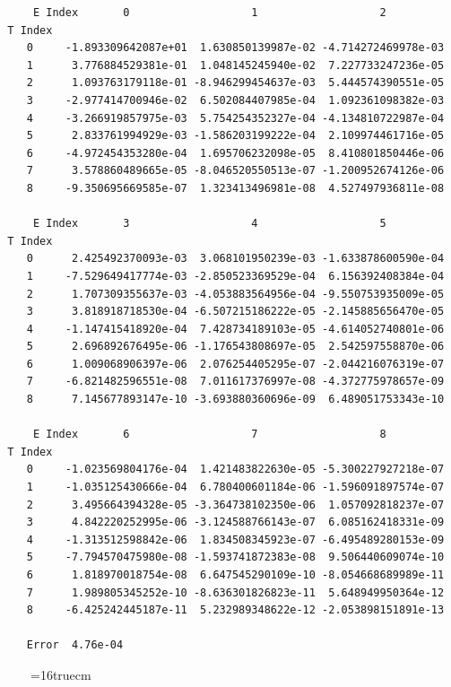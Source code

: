 \documentclass[12pt,dvipdfmx]{article}
\begin{document}
\begin{small}\begin{verbatim}
      E Index       0                   1                   2
  T Index
     0     -1.893309642087e+01  1.630850139987e-02 -4.714272469978e-03
     1      3.776884529381e-01  1.048145245940e-02  7.227733247236e-05
     2      1.093763179118e-01 -8.946299454637e-03  5.444574390551e-05
     3     -2.977414700946e-02  6.502084407985e-04  1.092361098382e-03
     4     -3.266919857975e-03  5.754254352327e-04 -4.134810722987e-04
     5      2.833761994929e-03 -1.586203199222e-04  2.109974461716e-05
     6     -4.972454353280e-04  1.695706232098e-05  8.410801850446e-06
     7      3.578860489665e-05 -8.046520550513e-07 -1.200952674126e-06
     8     -9.350695669585e-07  1.323413496981e-08  4.527497936811e-08

      E Index       3                   4                   5
  T Index
     0      2.425492370093e-03  3.068101950239e-03 -1.633878600590e-04
     1     -7.529649417774e-03 -2.850523369529e-04  6.156392408384e-04
     2      1.707309355637e-03 -4.053883564956e-04 -9.550753935009e-05
     3      3.818918718530e-04 -6.507215186222e-05 -2.145885656470e-05
     4     -1.147415418920e-04  7.428734189103e-05 -4.614052740801e-06
     5      2.696892676495e-06 -1.176543808697e-05  2.542597558870e-06
     6      1.009068906397e-06  2.076254405295e-07 -2.044216076319e-07
     7     -6.821482596551e-08  7.011617376997e-08 -4.372775978657e-09
     8      7.145677893147e-10 -3.693880360696e-09  6.489051753343e-10

      E Index       6                   7                   8
  T Index
     0     -1.023569804176e-04  1.421483822630e-05 -5.300227927218e-07
     1     -1.035125430666e-04  6.780400601184e-06 -1.596091897574e-07
     2      3.495664394328e-05 -3.364738102350e-06  1.057092818237e-07
     3      4.842220252995e-06 -3.124588766143e-07  6.085162418331e-09
     4     -1.313512598842e-06  1.834508345923e-07 -6.495489280153e-09
     5     -7.794570475980e-08 -1.593741872383e-08  9.506440609074e-10
     6      1.818970018754e-08  6.647545290109e-10 -8.054668689989e-11
     7      1.989805345252e-10 -8.636301826823e-11  5.648949950364e-12
     8     -6.425242445187e-11  5.232989348622e-12 -2.053898151891e-13

     Error  4.76e-04
\end{verbatim}\end{small}

\begin{figure} \label{met.3_3.1.1}
\epsfxsize=16truecm
\end{figure}
\newpage
\end{document}
